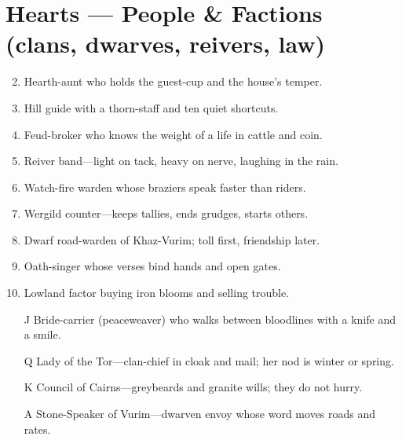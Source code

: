 \section*{Hearts --- People \& Factions (clans, dwarves, reivers, law)}
\begin{enumerate}
\setcounter{enumi}{1}
\item Hearth-aunt who holds the guest-cup and the house's temper.
\item Hill guide with a thorn-staff and ten quiet shortcuts.
\item Feud-broker who knows the weight of a life in cattle and coin.
\item Reiver band---light on tack, heavy on nerve, laughing in the rain.
\item Watch-fire warden whose braziers speak faster than riders.
\item Wergild counter---keeps tallies, ends grudges, starts others.
\item Dwarf road-warden of Khaz-Vurim; toll first, friendship later.
\item Oath-singer whose verses bind hands and open gates.
\item Lowland factor buying iron blooms and selling trouble.
\item[J] Bride-carrier (peaceweaver) who walks between bloodlines with a knife and a smile.
\item[Q] Lady of the Tor---clan-chief in cloak and mail; her nod is winter or spring.
\item[K] Council of Cairns---greybeards and granite wills; they do not hurry.
\item[A] Stone-Speaker of Vurim---dwarven envoy whose word moves roads and rates.
\end{enumerate}

